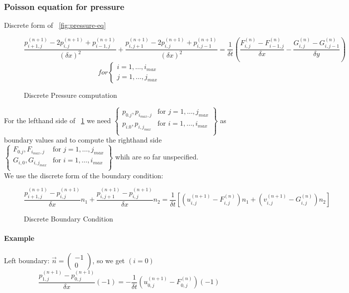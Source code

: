 \subsubsection{Poisson equation for pressure}
Discrete form of ~\ref{fig:pressure-eq}
\begin{figure}[H]
	\centering
   \[ \frac{p_{i+1,j}^{(n+1)} - 2p_{i,j}^{(n+1)} + p_{i-1,j}^{(n+1)}}{(\delta x)^2} + \frac{p_{i,j+1}^{(n+1)} - 2p_{i,j}^{(n+1)} + p_{i,j-1}^{(n+1)}}{(\delta x)^2} = \frac{1}{\delta t} \left( \frac{F_{i,j}^{(n)} - F_{i-1,j}^{(n)}}{\delta x} - \frac{G_{i,j}^{(n)} - G_{i,j-1}^{(n)}}{\delta y}\right) \]
\[ for \begin{cases}i = 1,\dots,i_{max}\\ j = 1,\dots,j_{max} \end{cases} \]
	\renewcommand{\thefigure}{3.38}
	\caption{Discrete Pressure computation}
	\label{fig:disc-p}
\end{figure}

For the lefthand side of ~\ref{fig:disc-p} we need 
$\begin{Bmatrix}
   p_{0.j}, p_{i_{max},j} &\text{for } j=1,\dots,j_{max} \\
   p_{i.0}, p_{i,j_{max}}  & \text{for } i=1,\dots,i_{max}\\
\end{Bmatrix}$
as boundary values and to compute the righthand side
$\begin{Bmatrix}
   F_{0.j},F_{i_{max},j} & \text{for } j = 1,\dots,j_{max}\\
   G_{i,0},G_{i,j_{max}} & \text{for } i = 1,\dots,i_{max}\\
\end{Bmatrix}$
whih are so far unspecified.\\

We use the discrete form of the boundary condition:
\begin{figure}[H]
	\centering
   \[ \frac{p_{i+1,j}^{(n+1)} - p_{i,j}^{(n+1)}}{\delta x} n_1 + \frac{p_{i,j+1}^{(n+1)} - p_{i,j}^{(n+1)}}{\delta x} n_2 = \frac{1}{\delta t} \left[ \left( u_{i,j}^{(n+1)} - F_{i,j}^{(n)} \right) n_1 + \left(v_{i,j}^{(n+1)} - G_{i,j}^{(n)}\right) n_2 \right] \]
	\renewcommand{\thefigure}{3.39}
	\caption{Discrete Boundary Condition}
	\label{fig:disc-pboundary}
\end{figure}

\paragraph{Example} Left boundary: $\vec{n} = \begin{pmatrix} -1 \\ 0 \end{pmatrix}$, so we get $(i = 0)$
   \[ \frac{p_{1,j}^{(n+1)} - p_{0,j}^{(n+1)}}{\delta x} (-1) = - \frac{1}{\delta t} \left( u_{0,j}^{(n+1)} -F_{0,j}^{(n)} \right) (-1) \]

